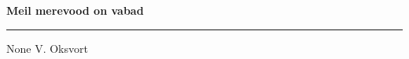 \documentclass[10pt]{book}
\begin{document}
{
  \samepage
  \raggedbottom
  \raggedright
  \sloppy


  \vspace{0.2in}

  \noindent\begin{minipage}{.1\textwidth}
    \hfill\vspace{0.1in}
  \end{minipage}%
  \noindent\begin{minipage}{.8\textwidth}
    \centering
    \bfseries
    \large Meil merevood on vabad
  \end{minipage}%
  \noindent\begin{minipage}{.1\textwidth}
      \hfill\vspace{0.1in}
  \end{minipage}

  \nopagebreak[4]
  \vspace{0.1in}
  \nopagebreak[4]
  \hrule height 0.05ex
  \nopagebreak[4]
  \vspace{-0.05in}

  {\footnotesize None \hfill V. Oksvort }\\
  \vspace{0.01in}



}
\end{document}
